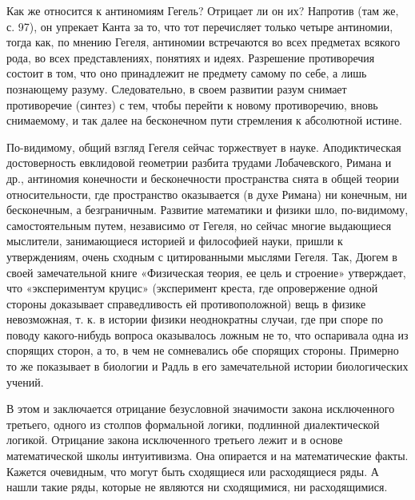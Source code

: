 Как же относится к антиномиям Гегель? Отрицает ли он их? Напротив (там же, с.
97), он упрекает Канта за то, что тот перечисляет только четыре антиномии,
тогда как, по мнению Гегеля, антиномии встречаются во всех предметах всякого
рода, во всех представлениях, понятиях и идеях. Разрешение противоречия состоит
в том, что оно принадлежит не предмету самому по себе, а лишь познающему
разуму. Следовательно, в своем развитии разум снимает противоречие (синтез) с
тем, чтобы перейти к новому противоречию, вновь снимаемому, и так далее на
бесконечном пути стремления к абсолютной истине.

По-видимому, общий взгляд Гегеля сейчас торжествует в науке. Аподиктическая
достоверность евклидовой геометрии разбита трудами Лобачевского, Римана и др.,
антиномия конечности и бесконечности пространства снята в общей теории
относительности, где пространство оказывается (в духе Римана) ни конечным, ни
бесконечным, а безграничным. Развитие математики и физики шло, по-видимому,
самостоятельным путем, независимо от Гегеля, но сейчас многие выдающиеся
мыслители, занимающиеся историей и философией науки, пришли к утверждениям,
очень сходным с цитированными мыслями Гегеля. Так, Дюгем в своей замечательной
книге «Физическая теория, ее цель и строение» утверждает, что «экспериментум
круцис» (эксперимент креста, где опровержение одной стороны доказывает
справедливость ей противоположной) вещь в физике невозможная, т. к. в истории
физики неоднократны случаи, где при споре по поводу какого-нибудь вопроса
оказывалось ложным не то, что оспаривала одна из спорящих сторон, а то, в чем
не сомневались обе спорящих стороны. Примерно то же показывает в биологии и
Радль в его замечательной истории биологических учений.

В этом и заключается отрицание безусловной значимости закона исключенного
третьего, одного из столпов формальной логики, подлинной диалектической
логикой. Отрицание закона исключенного третьего лежит и в основе математической
школы интуитивизма. Она опирается и на математические факты. Кажется очевидным,
что могут быть сходящиеся или расходящиеся ряды. А нашли такие ряды, которые не
являются ни сходящимися, ни расходящимися.

